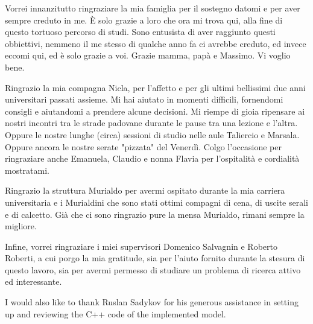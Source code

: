 \vspace{1.0cm}
{
	\setlength\parindent{0pt}

	Vorrei innanzitutto ringraziare la mia famiglia per il sostegno datomi e per aver sempre creduto in me.
	È solo grazie a loro che ora mi trova qui, alla fine di questo tortuoso percorso di studi.
	Sono entusista di aver raggiunto questi obbiettivi, nemmeno il me stesso di qualche anno fa ci avrebbe creduto,
	ed invece eccomi qui, ed è solo grazie a voi.
	Grazie mamma, papà e Massimo.
	Vi voglio bene.

	Ringrazio la mia compagna Nicla, per l'affetto e per gli ultimi bellissimi due anni universitari passati assieme.
	Mi hai aiutato in momenti difficili, fornendomi consigli e aiutandomi a prendere alcune decisioni.
	Mi riempe di gioia ripensare ai nostri incontri tra le strade padovane durante le pause tra una lezione e l'altra.
	Oppure le nostre lunghe (circa) sessioni di studio nelle aule Taliercio e Marsala.
	Oppure ancora le nostre serate "pizzata" del Venerdì.
	Colgo l'occasione per ringraziare anche Emanuela, Claudio e nonna Flavia per l'ospitalità
	e cordialità mostratami.

	Ringrazio la struttura Murialdo per avermi ospitato durante la mia carriera universitaria e
	i Murialdini che sono stati ottimi compagni di cena, di uscite serali e di calcetto.
	Già che ci sono ringrazio pure la mensa Murialdo, rimani sempre la migliore.

	\medskip

	Infine, vorrei ringraziare i miei supervisori Domenico Salvagnin e Roberto Roberti,
	a cui porgo la mia gratitude, sia per l'aiuto fornito durante la stesura di questo lavoro,
	sia per avermi permesso di studiare un problema di ricerca attivo ed interessante.

	I would also like to thank Ruslan Sadykov for his generous assistance in setting up \bapcod{} and reviewing the C++ code of the implemented model.

}


\vspace{1cm}

{
	\setlength\parindent{0pt}

	\textit{\UnivPlace}\\
	\textit{\GraduationDate}    \hfill    \AuthorName{} \AuthorSurname{}
}
